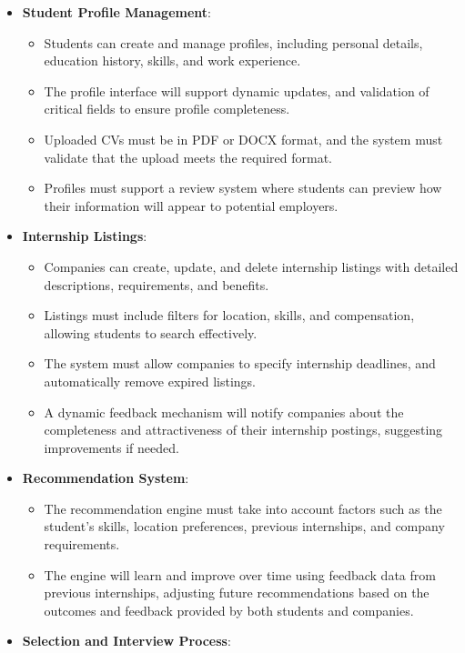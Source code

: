 \begin{itemize}
    \item \textbf{Student Profile Management}:
    \begin{itemize}
        \item Students can create and manage profiles, including personal details, education history, skills, and work experience.
        \item The profile interface will support dynamic updates, and validation of critical fields to ensure profile completeness.
        \item Uploaded CVs must be in PDF or DOCX format, and the system must validate that the upload meets the required format.
        \item Profiles must support a review system where students can preview how their information will appear to potential employers.
    \end{itemize}
    \item \textbf{Internship Listings}:
    \begin{itemize}
        \item Companies can create, update, and delete internship listings with detailed descriptions, requirements, and benefits.
        \item Listings must include filters for location, skills, and compensation, allowing students to search effectively.
        \item The system must allow companies to specify internship deadlines, and automatically remove expired listings.
        \item A dynamic feedback mechanism will notify companies about the completeness and attractiveness of their internship postings, suggesting improvements if needed.
    \end{itemize}
    \item \textbf{Recommendation System}:
    \begin{itemize}
        \item The recommendation engine must take into account factors such as the student’s skills, location preferences, previous internships, and company requirements.
        \item The engine will learn and improve over time using feedback data from previous internships, adjusting future recommendations based on the outcomes and feedback provided by both students and companies.
    \end{itemize}
    \item \textbf{Selection and Interview Process}:

\end{itemize}
